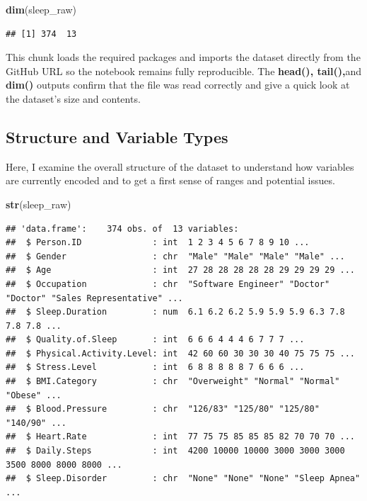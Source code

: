 \documentclass[
]{article}
\newenvironment{Shaded}{\begin{snugshade}}{\end{snugshade}}
\newcommand{\FunctionTok}[1]{\textcolor[rgb]{0.13,0.29,0.53}{\textbf{#1}}}
\newcommand{\NormalTok}[1]{#1}
\begin{document}
\begin{Shaded}
\begin{Highlighting}[]
\FunctionTok{dim}\NormalTok{(sleep\_raw)}
\end{Highlighting}
\end{Shaded}

\begin{verbatim}
## [1] 374  13
\end{verbatim}

This chunk loads the required packages and imports the dataset directly
from the GitHub URL so the notebook remains fully reproducible. The
\textbf{head(), tail(),}and \textbf{dim()} outputs confirm that the file
was read correctly and give a quick look at the dataset's size and
contents.

\subsection{Structure and Variable
Types}\label{structure-and-variable-types}

Here, I examine the overall structure of the dataset to understand how
variables are currently encoded and to get a first sense of ranges and
potential issues.

\begin{Shaded}
\begin{Highlighting}[]
\FunctionTok{str}\NormalTok{(sleep\_raw)}
\end{Highlighting}
\end{Shaded}

\begin{verbatim}
## 'data.frame':    374 obs. of  13 variables:
##  $ Person.ID              : int  1 2 3 4 5 6 7 8 9 10 ...
##  $ Gender                 : chr  "Male" "Male" "Male" "Male" ...
##  $ Age                    : int  27 28 28 28 28 28 29 29 29 29 ...
##  $ Occupation             : chr  "Software Engineer" "Doctor" "Doctor" "Sales Representative" ...
##  $ Sleep.Duration         : num  6.1 6.2 6.2 5.9 5.9 5.9 6.3 7.8 7.8 7.8 ...
##  $ Quality.of.Sleep       : int  6 6 6 4 4 4 6 7 7 7 ...
##  $ Physical.Activity.Level: int  42 60 60 30 30 30 40 75 75 75 ...
##  $ Stress.Level           : int  6 8 8 8 8 8 7 6 6 6 ...
##  $ BMI.Category           : chr  "Overweight" "Normal" "Normal" "Obese" ...
##  $ Blood.Pressure         : chr  "126/83" "125/80" "125/80" "140/90" ...
##  $ Heart.Rate             : int  77 75 75 85 85 85 82 70 70 70 ...
##  $ Daily.Steps            : int  4200 10000 10000 3000 3000 3000 3500 8000 8000 8000 ...
##  $ Sleep.Disorder         : chr  "None" "None" "None" "Sleep Apnea" ...
\end{verbatim}
\end{document}
